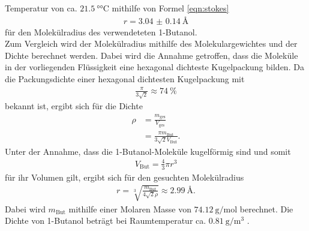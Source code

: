 Temperatur von ca. $\SI{21.5}{\degree\celsius}$
mithilfe von Formel \ref{eqn:stokes} 
\begin{align}
  r = \SI{3.04(014)}{\angstrom}
\end{align}
für den Molekülradius des verwendeteten 1-Butanol. \\
Zum Vergleich wird der Molekülradius mithilfe des Molekulargewichtes und der Dichte berechnet werden. Dabei wird die Annahme getroffen, 
dass die Moleküle in der vorliegenden Flüssigkeit eine hexagonal dichteste Kugelpackung bilden.
Da die Packungsdichte einer hexagonal dichtesten Kugelpackung mit 
\begin{align}
  \frac{\pi}{3\sqrt{2}} \approx \SI{74}{\percent}
\end{align}
bekannt ist, ergibt sich für die Dichte
\begin{align}
  \rho &= \frac{m_\text{ges}}{V_\text{ges}} \\
       &= \frac{\pi m_\text{But}}{3\sqrt{2}V_\text{But}}.
\end{align}
Unter der Annahme, dass die 1-Butanol-Moleküle kugelförmig sind und somit 
\begin{align}
  V_\text{But} = \frac{4}{3} \pi r^3
\end{align}
für ihr Volumen gilt, ergibt sich für den gesuchten Molekülradius
\begin{align}
  r = \sqrt[3]{\frac{m_\text{But}}{4\sqrt{2}\rho}} \approx \SI{2.99}{\angstrom} .
\end{align}
Dabei wird $m_\text{But}$ mithilfe einer Molaren Masse von $\SI{74.12}{\gram\per\mole}$ berechnet. 
Die Dichte von 1-Butanol beträgt bei Raumtemperatur ca. $\SI{0.81}{\gram\per\cubic\meter}$ \cite{dichte}.